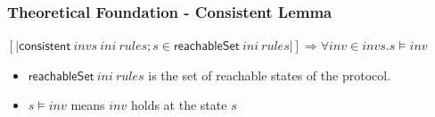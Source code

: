 \documentclass{beamer}
\begin{document}
\begin{frame}\frametitle{Theoretical Foundation - Consistent Lemma}

$[| \mathsf{consistent}~  invs ~ ini~  rules;
  s \in \mathsf{reachableSet}~  ini~rules|]\Longrightarrow
  \forall  inv \in invs. s \models inv$

\begin{itemize}
\item $\mathsf{reachableSet}~   ini~ rules$
is the set of reachable states of the protocol.

\item $s \models inv$ means $inv$ holds at the state $s$

\end{itemize}
\end{frame}
\end{document}
